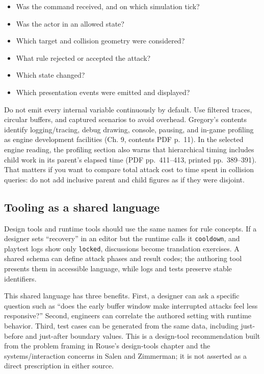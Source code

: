 \begin{itemize}
\tightlist
\item
  Was the command received, and on which simulation tick?
\item
  Was the actor in an allowed state?
\item
  Which target and collision geometry were considered?
\item
  What rule rejected or accepted the attack?
\item
  Which state changed?
\item
  Which presentation events were emitted and displayed?
\end{itemize}

Do not emit every internal variable continuously by default. Use filtered traces, circular buffers, and captured scenarios to avoid overhead. Gregory's contents identify logging/tracing, debug drawing, console, pausing, and in-game profiling as engine development facilities (Ch. 9, contents PDF p.~11). In the selected engine reading, the profiling section also warns that hierarchical timing includes child work in its parent's elapsed time (PDF pp.~411--413, printed pp.~389--391). That matters if you want to compare total attack cost to time spent in collision queries: do not add inclusive parent and child figures as if they were disjoint.

\subsection{Tooling as a shared language}\label{06-engine-ii-ch032-tooling-as-a-shared-language}

\hypertarget{06-engine-ii-ch032-tooling-as-a-shared-language}{}

Design tools and runtime tools should use the same names for rule concepts. If a designer sets ``recovery'' in an editor but the runtime calls it \texttt{cooldown}, and playtest logs show only \texttt{locked}, discussions become translation exercises. A shared schema can define attack phases and result codes; the authoring tool presents them in accessible language, while logs and tests preserve stable identifiers.

This shared language has three benefits. First, a designer can ask a specific question such as ``does the early buffer window make interrupted attacks feel less responsive?'' Second, engineers can correlate the authored setting with runtime behavior. Third, test cases can be generated from the same data, including just-before and just-after boundary values. This is a design-tool recommendation built from the problem framing in Rouse's design-tools chapter and the systems/interaction concerns in Salen and Zimmerman; it is not asserted as a direct prescription in either source.

